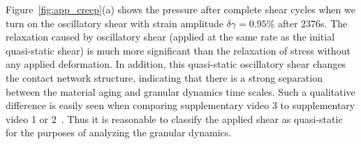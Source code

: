 \documentclass[twocolumn,showkeys,superscriptaddress,preprintnumbers,amsmath,amssymb,showpacs,prx,longbibliography]{revtex4-2}
\newcommand{\yiqiu}{\textcolor{black}}
\begin{document}
Figure~\ref{fig:app_creep}(a) shows the pressure after complete shear cycles when we turn on the oscillatory shear with strain amplitude $\delta\gamma=0.95\%$ after 2376s.  The relaxation caused by oscillatory shear (applied at the same rate as the initial quasi-static shear) is much more significant than the relaxation of stress without any applied deformation. In addition, this quasi-static oscillatory shear changes the contact network structure, indicating that there is a strong separation between the material aging and granular dynamics time scales. Such a qualitative difference is easily seen when comparing supplementary video 3 to supplementary video 1 or 2~\cite{Note1}.  Thus it is reasonable to classify the applied shear as quasi-static for the purposes of analyzing the granular dynamics.









\end{document}
